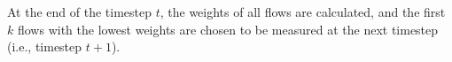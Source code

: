 At the end of the timestep $t$, the weights of all flows are calculated, and the first $k$ flows with the lowest weights are chosen to be measured at the next timestep (i.e., timestep $t+1$).
